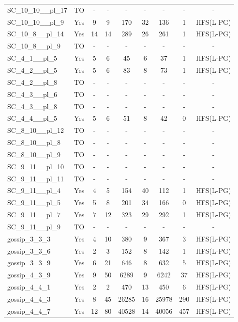 \documentclass{article}
\begin{document}
\begin{tabular}{lcccccccc}
SC\_10\_10\_\_pl\_17 & TO & - & - & - & - & - & - & - \\
SC\_10\_10\_\_pl\_9 & Yes & 9 & 9 & 170 & 32 & 136 & 1 & HFS(L-PG) \\
SC\_10\_8\_\_pl\_14 & Yes & 14 & 14 & 289 & 26 & 261 & 1 & HFS(L-PG) \\
SC\_10\_8\_\_pl\_9 & TO & - & - & - & - & - & - & - \\
SC\_4\_1\_\_pl\_5 & Yes & 5 & 6 & 45 & 6 & 37 & 1 & HFS(L-PG) \\
SC\_4\_2\_\_pl\_5 & Yes & 5 & 6 & 83 & 8 & 73 & 1 & HFS(L-PG) \\
SC\_4\_2\_\_pl\_8 & TO & - & - & - & - & - & - & - \\
SC\_4\_3\_\_pl\_6 & TO & - & - & - & - & - & - & - \\
SC\_4\_3\_\_pl\_8 & TO & - & - & - & - & - & - & - \\
SC\_4\_4\_\_pl\_5 & Yes & 5 & 6 & 51 & 8 & 42 & 0 & HFS(L-PG) \\
SC\_8\_10\_\_pl\_12 & TO & - & - & - & - & - & - & - \\
SC\_8\_10\_\_pl\_8 & TO & - & - & - & - & - & - & - \\
SC\_8\_10\_\_pl\_9 & TO & - & - & - & - & - & - & - \\
SC\_9\_11\_\_pl\_10 & TO & - & - & - & - & - & - & - \\
SC\_9\_11\_\_pl\_11 & TO & - & - & - & - & - & - & - \\
SC\_9\_11\_\_pl\_4 & Yes & 4 & 5 & 154 & 40 & 112 & 1 & HFS(L-PG) \\
SC\_9\_11\_\_pl\_5 & Yes & 5 & 8 & 201 & 34 & 166 & 0 & HFS(L-PG) \\
SC\_9\_11\_\_pl\_7 & Yes & 7 & 12 & 323 & 29 & 292 & 1 & HFS(L-PG) \\
SC\_9\_11\_\_pl\_9 & TO & - & - & - & - & - & - & - \\
gossip\_3\_3\_3 & Yes & 4 & 10 & 380 & 9 & 367 & 3 & HFS(L-PG) \\
gossip\_3\_3\_6 & Yes & 2 & 3 & 152 & 8 & 142 & 1 & HFS(L-PG) \\
gossip\_3\_3\_9 & Yes & 6 & 21 & 646 & 8 & 632 & 5 & HFS(L-PG) \\
gossip\_4\_3\_9 & Yes & 9 & 50 & 6289 & 9 & 6242 & 37 & HFS(L-PG) \\
gossip\_4\_4\_1 & Yes & 2 & 2 & 470 & 13 & 450 & 6 & HFS(L-PG) \\
gossip\_4\_4\_3 & Yes & 8 & 45 & 26285 & 16 & 25978 & 290 & HFS(L-PG) \\
gossip\_4\_4\_7 & Yes & 12 & 80 & 40528 & 14 & 40056 & 457 & HFS(L-PG) \\

\end{tabular}
\end{document}
